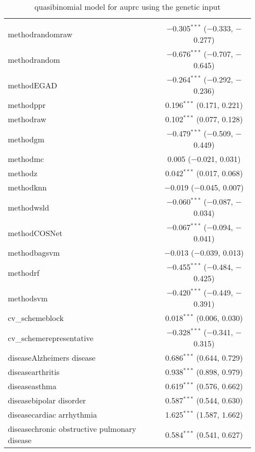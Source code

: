 
\begin{table}[!htbp] \centering 
  \caption{quasibinomial model for auprc using the genetic input} 
  \label{} 
\begin{tabular}{@{\extracolsep{5pt}}lc} 
\\[-1.8ex]\hline 
\hline \\[-1.8ex] 
 methodrandomraw & $-$0.305$^{***}$ ($-$0.333, $-$0.277) \\ 
  methodrandom & $-$0.676$^{***}$ ($-$0.707, $-$0.645) \\ 
  methodEGAD & $-$0.264$^{***}$ ($-$0.292, $-$0.236) \\ 
  methodppr & 0.196$^{***}$ (0.171, 0.221) \\ 
  methodraw & 0.102$^{***}$ (0.077, 0.128) \\ 
  methodgm & $-$0.479$^{***}$ ($-$0.509, $-$0.449) \\ 
  methodmc & 0.005 ($-$0.021, 0.031) \\ 
  methodz & 0.042$^{***}$ (0.017, 0.068) \\ 
  methodknn & $-$0.019 ($-$0.045, 0.007) \\ 
  methodwsld & $-$0.060$^{***}$ ($-$0.087, $-$0.034) \\ 
  methodCOSNet & $-$0.067$^{***}$ ($-$0.094, $-$0.041) \\ 
  methodbagsvm & $-$0.013 ($-$0.039, 0.013) \\ 
  methodrf & $-$0.455$^{***}$ ($-$0.484, $-$0.425) \\ 
  methodsvm & $-$0.420$^{***}$ ($-$0.449, $-$0.391) \\ 
  cv\_schemeblock & 0.018$^{***}$ (0.006, 0.030) \\ 
  cv\_schemerepresentative & $-$0.328$^{***}$ ($-$0.341, $-$0.315) \\ 
  diseaseAlzheimers disease & 0.686$^{***}$ (0.644, 0.729) \\ 
  diseasearthritis & 0.938$^{***}$ (0.898, 0.979) \\ 
  diseaseasthma & 0.619$^{***}$ (0.576, 0.662) \\ 
  diseasebipolar disorder & 0.587$^{***}$ (0.544, 0.630) \\ 
  diseasecardiac arrhythmia & 1.625$^{***}$ (1.587, 1.662) \\ 
  diseasechronic obstructive pulmonary disease & 0.584$^{***}$ (0.541, 0.627) \\ 

\end{tabular}
\end{table}
